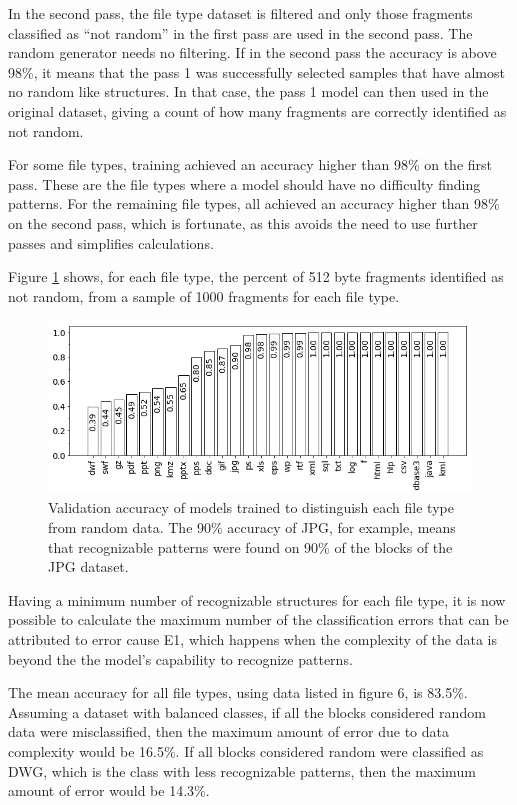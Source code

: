In the second pass, the file type dataset is filtered and only those fragments classified as ``not random'' in the first pass are used in the second pass. The random generator needs no filtering. If in the second pass the accuracy is above 98\%, it means that the pass 1 was successfully selected samples that have almost no random like structures. In that case, the pass 1 model can then used in the original dataset, giving a count of how many fragments are correctly identified as not random.

For some file types, training achieved an accuracy higher than 98\% on the first pass. These are the file types where a model should have no difficulty finding patterns. For the remaining file types, all achieved an accuracy higher than 98\% on the second pass, which is fortunate, as this avoids the need to use further passes and  simplifies calculations.

Figure \ref{fig:not_random} shows, for each file type, the percent of 512 byte fragments identified as not random, from a sample of 1000 fragments for each file type.

\noindent
\begin{figure}[htb!]
\centering\includegraphics[width=1.0\textwidth]{content/random.png}
\caption{\label{fig:not_random}Validation accuracy of models trained to distinguish each file type from random data. The 90\% accuracy of JPG, for example, means that recognizable patterns were found on 90\% of the blocks of the JPG dataset.}%
\end{figure}

Having a minimum number of recognizable structures for each file type, it is now possible to calculate the maximum number of the classification errors that can be attributed to error cause E1, which happens when the complexity of the data is beyond the the model’s capability to recognize patterns.

The mean accuracy for all file types, using data listed in figure 6, is 83.5\%.  Assuming a dataset with balanced classes, if all the blocks considered random data were misclassified, then the maximum amount of error due to data complexity would be 16.5\%. If all blocks considered random were classified as DWG, which is the class with less recognizable patterns, then the maximum amount of error would be 14.3\%.


